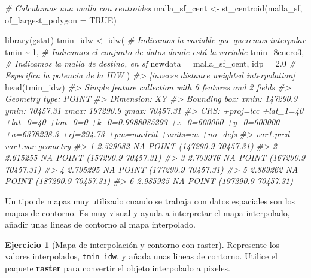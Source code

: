 \documentclass[
]{report}
\newenvironment{Shaded}{\begin{snugshade}}{\end{snugshade}}
\newcommand{\AttributeTok}[1]{\textcolor[rgb]{0.77,0.63,0.00}{#1}}
\newcommand{\CommentTok}[1]{\textcolor[rgb]{0.56,0.35,0.01}{\textit{#1}}}
\newcommand{\ConstantTok}[1]{\textcolor[rgb]{0.00,0.00,0.00}{#1}}
\newcommand{\DecValTok}[1]{\textcolor[rgb]{0.00,0.00,0.81}{#1}}
\newcommand{\FloatTok}[1]{\textcolor[rgb]{0.00,0.00,0.81}{#1}}
\newcommand{\FunctionTok}[1]{\textcolor[rgb]{0.00,0.00,0.00}{#1}}
\newcommand{\NormalTok}[1]{#1}
\newcommand{\OtherTok}[1]{\textcolor[rgb]{0.56,0.35,0.01}{#1}}
\newcommand{\SpecialCharTok}[1]{\textcolor[rgb]{0.00,0.00,0.00}{#1}}
\theoremstyle{definition}
\theoremstyle{definition}
\theoremstyle{definition}
\newtheorem{exercise}{Ejercicio}[chapter]
\theoremstyle{definition}
\theoremstyle{remark}
\begin{document}
\begin{Shaded}
\begin{Highlighting}[]
\CommentTok{\# Calculamos una malla con centroides}
\NormalTok{malla\_sf\_cent }\OtherTok{\textless{}{-}} \FunctionTok{st\_centroid}\NormalTok{(malla\_sf, }\AttributeTok{of\_largest\_polygon =} \ConstantTok{TRUE}\NormalTok{)}

\FunctionTok{library}\NormalTok{(gstat)}
\NormalTok{tmin\_idw }\OtherTok{\textless{}{-}} \FunctionTok{idw}\NormalTok{(}
  \CommentTok{\# Indicamos la variable que queremos interpolar}
\NormalTok{  tmin }\SpecialCharTok{\textasciitilde{}} \DecValTok{1}\NormalTok{,}
  \CommentTok{\# Indicamos el conjunto de datos donde está la variable}
\NormalTok{  tmin\_8enero3,}
  \CommentTok{\# Indicamos la malla de destino, en sf}
  \AttributeTok{newdata =}\NormalTok{ malla\_sf\_cent,}
  \AttributeTok{idp =} \FloatTok{2.0} \CommentTok{\# Especifica la potencia de la IDW}
\NormalTok{)}
\CommentTok{\#\textgreater{} [inverse distance weighted interpolation]}
\FunctionTok{head}\NormalTok{(tmin\_idw)}
\CommentTok{\#\textgreater{} Simple feature collection with 6 features and 2 fields}
\CommentTok{\#\textgreater{} Geometry type: POINT}
\CommentTok{\#\textgreater{} Dimension:     XY}
\CommentTok{\#\textgreater{} Bounding box:  xmin: 147290.9 ymin: 70457.31 xmax: 197290.9 ymax: 70457.31}
\CommentTok{\#\textgreater{} CRS:           +proj=lcc +lat\_1=40 +lat\_0=40 +lon\_0=0 +k\_0=0.9988085293 +x\_0=600000 +y\_0=600000 +a=6378298.3 +rf=294.73 +pm=madrid +units=m +no\_defs}
\CommentTok{\#\textgreater{}   var1.pred var1.var                  geometry}
\CommentTok{\#\textgreater{} 1  2.529082       NA POINT (147290.9 70457.31)}
\CommentTok{\#\textgreater{} 2  2.615255       NA POINT (157290.9 70457.31)}
\CommentTok{\#\textgreater{} 3  2.703976       NA POINT (167290.9 70457.31)}
\CommentTok{\#\textgreater{} 4  2.795295       NA POINT (177290.9 70457.31)}
\CommentTok{\#\textgreater{} 5  2.889262       NA POINT (187290.9 70457.31)}
\CommentTok{\#\textgreater{} 6  2.985925       NA POINT (197290.9 70457.31)}
\end{Highlighting}
\end{Shaded}

Un tipo de mapas muy utilizado cuando se trabaja con datos espaciales son los
mapas de contorno. Es muy visual y ayuda a interpretar el mapa interpolado,
añadir unas lineas de contorno al mapa interpolado.

\begin{exercise}[Mapa de interpolación y contorno con raster]
\protect\hypertarget{exr:ex14}{}\label{exr:ex14}Represente los valores interpolados, \texttt{tmin\_idw}, y añada unas lineas de
contorno. Utilice el paquete \textbf{raster} para convertir el objeto interpolado a
pixeles.
\end{exercise}
\end{document}
